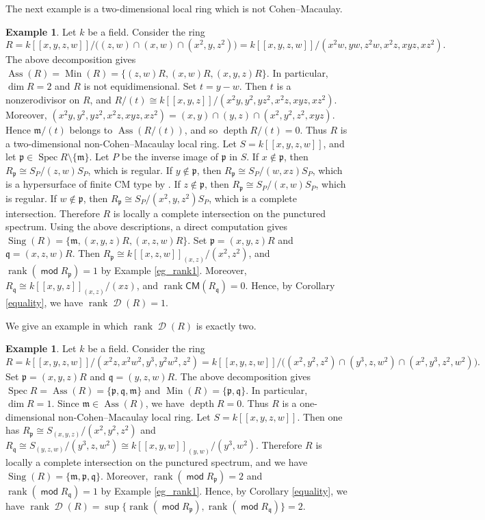 \documentclass[10pt]{amsart}
\theoremstyle{definition}
\newtheorem{ex}[thm]{Example}
\theoremstyle{remark}
\numberwithin{equation}{thm}
\def\Ass{\operatorname{Ass}}
\def\CM{\mathsf{CM}}
\def\d{\operatorname{\mathscr{D}}}
\def\depth{\operatorname{depth}}
\def\dim{\operatorname{dim}}
\def\m{\mathfrak{m}}
\def\Min{\operatorname{Min}}
\def\mod{\operatorname{\mathsf{mod}}}
\def\p{\mathfrak{p}}
\def\q{\mathfrak{q}}
\def\rank{\operatorname{rank}}
\def\Sing{\operatorname{Sing}}
\def\Spec{\operatorname{Spec}}
\def\sup{\operatorname{sup}}
\begin{document}
The next example is a two-dimensional local ring which is not Cohen--Macaulay.
\begin{ex}\label{eg_dim2}
Let $k$ be a field. 
Consider the ring
\[
R=k[\![x,y,z,w]\!]/\bigl((z,w)\cap(x,w)\cap(x^2,y,z^2)\bigr)
 =k[\![x,y,z,w]\!]/(x^2w,yw,z^2w,x^2z,xyz,xz^2).
\]
The above decomposition gives $\Ass(R)=\Min(R)=\{(z,w)R,(x,w)R,(x,y,z)R\}$.
In particular, $\dim R=2$ and $R$ is not equidimensional.
Set $t=y-w$.
Then $t$ is a nonzerodivisor on $R$, and $R/(t)\cong k[\![x,y,z]\!]/(x^2y,y^2,yz^2,x^2z,xyz,xz^2)$.
Moreover, $(x^2y,y^2,yz^2,x^2z,xyz,xz^2)=(x,y)\cap(y,z)\cap(x^2,y^2,z^2,xyz)$.
Hence $\m/(t)$ belongs to $\Ass(R/(t))$, and so $\depth R/(t)=0$.
Thus $R$ is a two-dimensional non-Cohen--Macaulay local ring.
Let $S=k[\![x,y,z,w]\!]$, and let $\p\in\Spec R\setminus\{\m\}$.
Let $P$ be the inverse image of $\p$ in $S$.
If $x\notin \p$, then $R_{\p}\cong S_P/(z,w)S_P$, which is regular.
If $y\notin \p$, then $R_{\p}\cong S_P/(w,xz)S_P$, which is a hypersurface of finite CM type by \cite[Theorem 4.18]{LW}.
If $z\notin \p$, then $R_{\p}\cong S_P/(x,w)S_P$, which is regular.
If $w\notin \p$, then $R_{\p}\cong S_P/(x^2,y,z^2)S_P$, which is a complete intersection.
Therefore $R$ is locally a complete intersection on the punctured spectrum.
Using the above descriptions, a direct computation gives $\Sing(R)=\{\m,(x,y,z)R,(x,z,w)R\}$.
Set $\p=(x,y,z)R$ and $\q=(x,z,w)R$.
Then $R_{\p}\cong k[\![x,z,w]\!]_{(x,z)}/(x^{2},z^{2})$, and $\rank(\mod R_{\p})=1$ by Example \ref{eg_rank1}.
Moreover, $R_{\q}\cong k[\![x,y,z]\!]_{(x,z)}/(xz)$, and $\rank\CM(R_{\q})=0$.
Hence, by Corollary \ref{equality}, we have $\rank\d(R)=1$.
\end{ex}
We give an example in which $\rank\d(R)$ is exactly two.
\begin{ex}\label{eg_rank2}
Let $k$ be a field.
Consider the ring \[
R=k[\![x,y,z,w]\!]/(x^{2}z,x^{2}w^{2},y^{3},y^{2}w^{2},z^{2})=k[\![x,y,z,w]\!]/\bigl((x^{2},y^{2},z^{2})\cap(y^{3},z,w^{2})\cap(x^{2},y^{3},z^{2},w^{2})\bigr).
\]
Set $\p=(x,y,z)R$ and $\q=(y,z,w)R$.
The above decomposition gives $\Spec R=\Ass(R)=\{\p,\q,\m\}$ and $\Min(R)=\{\p,\q\}$.
In particular, $\dim R=1$.
Since $\m\in\Ass(R)$, we have $\depth R=0$.
Thus $R$ is a one-dimensional non-Cohen--Macaulay local ring.
Let $S=k[\![x,y,z,w]\!]$.
Then one has $R_{\p}\cong S_{(x,y,z)}/(x^{2},y^{2},z^{2})$ and $R_{\q}\cong S_{(y,z,w)}/(y^{3},z,w^{2})\cong k[\![x,y,w]\!]_{(y,w)}/(y^{3},w^{2})$.
Therefore $R$ is locally a complete intersection on the punctured spectrum, and we have $\Sing(R)=\{\m,\p,\q\}$.
Moreover, $\rank(\mod R_{\p})=2$ and $\rank(\mod R_{\q})=1$ by Example \ref{eg_rank1}.
Hence, by Corollary \ref{equality}, we have $\rank\d(R)=\sup\{\rank(\mod R_{\p}),\rank(\mod R_{\q})\}=2$.
\end{ex}
\end{document}
